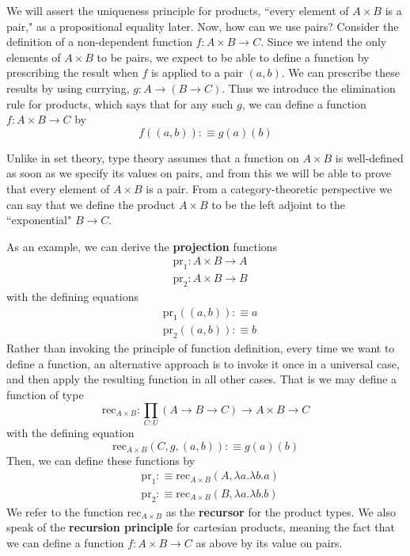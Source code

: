 We will assert the uniqueness principle for products, ``every element of $A\times B$ is a pair," as a propositional equality later. Now, how can we use pairs? Consider the definition of a non-dependent function $f:A\times B\rightarrow C$. Since we intend the only elements of $A \times B$ to be pairs, we expect to be able to define a function by prescribing the result when $f$ is applied to a pair $(a,b)$. We can prescribe these results by using currying, $g:A\rightarrow (B\rightarrow C)$. Thus we introduce the elimination rule for products, which says that for any such $g$, we can define a function $f:A\times B\rightarrow C$ by $$f((a,b)) :\equiv g(a)(b)$$

Unlike in set theory, type theory assumes that a function on $A\times B$ is well-defined as soon as we specify its values on pairs, and from this we will be able to prove that every element of $A\times B$ is a pair. From a category-theoretic perspective we can say that we define the product $A\times B$ to be the left adjoint to the ``exponential" $B\rightarrow C$.

As an example, we can derive the \textbf{projection} functions \begin{align*}
    &\text{pr}_1:A\times B\rightarrow A \\
    &\text{pr}_2:A\times B\rightarrow B
\end{align*}
with the defining equations \begin{align*}
    &\text{pr}_1((a,b)) :\equiv a \\
    &\text{pr}_2((a,b)) :\equiv b 
\end{align*}
Rather than invoking the principle of function definition, every time we want to define a function, an alternative approach is to invoke it once in a universal case, and then apply the resulting function in all other cases. That is we may define a function of type \begin{equation}
    \text{rec}_{A\times B}:\prod_{C:U}(A\rightarrow B\rightarrow C)\rightarrow A\times B\rightarrow C
\end{equation}
with the defining equation $$\text{rec}_{A\times B}(C,g,(a,b)) :\equiv g(a)(b)$$
Then, we can define these functions by \begin{align*}
    &\text{pr}_1 :\equiv \text{rec}_{A\times B}(A,\lambda a.\lambda b.a) \\
    &\text{pr}_2 :\equiv \text{rec}_{A\times B}(B,\lambda a.\lambda b.b)
\end{align*}
We refer to the function $\text{rec}_{A\times B}$ as the \textbf{recursor} for the product types. We also speak of the \textbf{recursion principle} for cartesian products, meaning the fact that we can define a function $f:A\times B\rightarrow C$ as above by its value on pairs.

